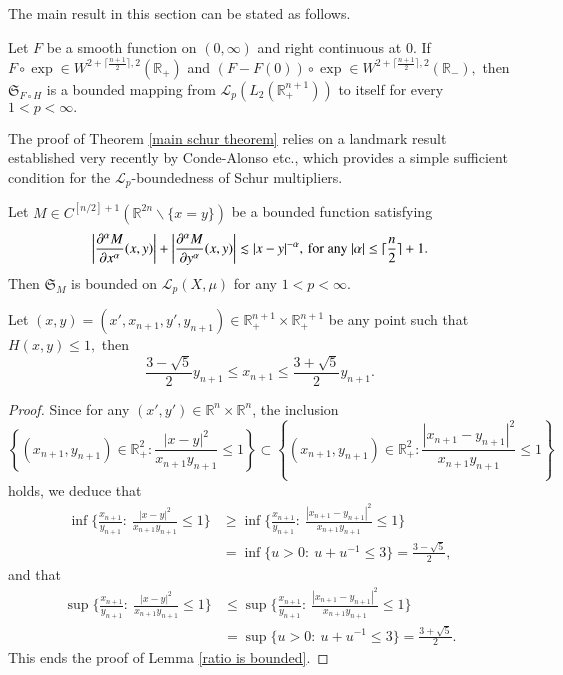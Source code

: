 \documentclass[12pt]{amsart}
\begin{document}
The main result in this section can be stated as follows.
\begin{theorem}\label{main schur theorem} Let $F$ be a smooth function on $(0,\infty)$ and right continuous at $0.$ If $F\circ\exp\in W^{2+\lceil\frac{n+1}{2}\rceil,2}(\mathbb{R}_+)$ and $(F-F(0))\circ\exp\in W^{2+\lceil\frac{n+1}{2}\rceil,2}(\mathbb{R}_-),$ then $\mathfrak{S}_{F\circ H}$ is a bounded mapping from $\mathcal{L}_p(L_2(\mathbb{R}^{n+1}_+))$ to itself for every $1<p<\infty.$
\end{theorem}

The proof of Theorem \ref{main schur theorem} relies on a landmark result established very recently by Conde-Alonso etc., which provides a simple sufficient condition for the $\mathcal{L}_p$-boundedness of Schur multipliers.
\begin{theorem}\cite[Theorem A]{MR4660138}\label{Annalspaper}
Let $M\in C^{[n/2]+1}(\mathbb{R}^{2n}\backslash \{x=y\})$ be a bounded function satisfying
$$\left|\frac{\partial^\alpha M}{\partial x^\alpha}(x,y)\right|+\left|\frac{\partial^\alpha M}{\partial y^\alpha}(x,y)\right|\lesssim |x-y|^{-\alpha},\, {\rm for}\ {\rm any}\ |\alpha|\leq \lceil\frac{n}{2}\rceil+1.$$
Then $\mathfrak{S}_M$ is bounded on $\mathcal{L}_p(X,\mu)$ for any $1<p<\infty$.
\end{theorem}

\begin{lemma}\label{ratio is bounded}
Let $(x,y)=(x',x_{n+1},y',y_{n+1})\in\mathbb{R}_+^{n+1}\times \mathbb{R}_+^{n+1}$ be any point such that $H(x,y)\leq 1,$ then
$$\frac{3-\sqrt{5}}{2}y_{n+1}\leq x_{n+1}\leq \frac{3+\sqrt{5}}{2}y_{n+1}.$$	
\end{lemma}
\begin{proof} Since for any $(x',y')\in \mathbb{R}^n\times\mathbb{R}^n$, the inclusion $$\left\{(x_{n+1},y_{n+1})\in\mathbb{R}_+^2:\frac{|x-y|^2}{x_{n+1}y_{n+1}}\leq 1\right\}\subset \left\{(x_{n+1},y_{n+1})\in\mathbb{R}_+^2:\frac{|x_{n+1}-y_{n+1}|^2}{x_{n+1}y_{n+1}}\leq 1\right\}$$
holds, we deduce that
\begin{align*}
\inf\Big\{\frac{x_{n+1}}{y_{n+1}}:\ \frac{|x-y|^2}{x_{n+1}y_{n+1}}\leq 1\Big\}&\geq\inf\Big\{\frac{x_{n+1}}{y_{n+1}}:\ \frac{|x_{n+1}-y_{n+1}|^2}{x_{n+1}y_{n+1}}\leq 1\Big\}\\
&=\inf\{u>0:\ u+u^{-1}\leq 3\}=\frac{3-\sqrt{5}}{2},
\end{align*}
and that
\begin{align*}
\sup\Big\{\frac{x_{n+1}}{y_{n+1}}:\ \frac{|x-y|^2}{x_{n+1}y_{n+1}}\leq 1\Big\}&\leq\sup\Big\{\frac{x_{n+1}}{y_{n+1}}:\ \frac{|x_{n+1}-y_{n+1}|^2}{x_{n+1}y_{n+1}}\leq 1\Big\}\\
&=\sup\{u>0:\ u+u^{-1}\leq 3\}=\frac{3+\sqrt{5}}{2}.
\end{align*}
This ends the proof of Lemma \ref{ratio is bounded}.
\end{proof}
\end{document}
